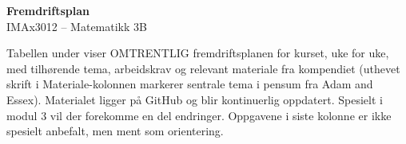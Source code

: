 \documentclass[10pt,a4paper]{article}
\begin{document}
\begin{center}
{\Large\bfseries Fremdriftsplan}\\[.3em]
{\large IMAx3012 -- Matematikk 3B}
\end{center}
\vspace{.6em}

Tabellen under viser OMTRENTLIG fremdriftsplanen for kurset, uke for uke, med tilhørende tema, arbeidskrav og relevant materiale fra kompendiet (uthevet skrift i Materiale-kolonnen markerer sentrale tema i pensum fra Adam and Essex). Materialet ligger på GitHub og blir kontinuerlig oppdatert. Spesielt i modul 3 vil der forekomme en del endringer. Oppgavene i siste kolonne er ikke spesielt anbefalt, men ment som orientering.

\begingroup
\scriptsize
\setlength{\tabcolsep}{3pt}
\renewcommand{\arraystretch}{1.1}
\end{document}
